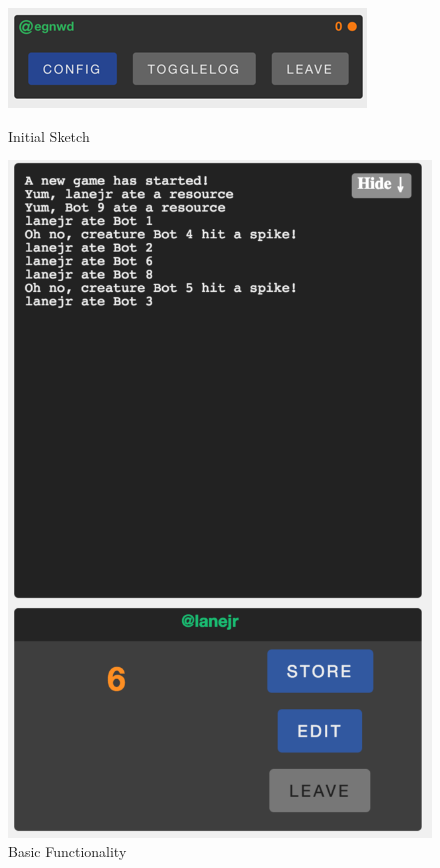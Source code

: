 \documentclass[a4paper, 6pt]{article}
\begin{document}
\begin{figure}[ht!]
\includegraphics[width=\linewidth]{userPanel_01.png}
\caption{Initial Sketch}
\endminipage\hfill
{}
\includegraphics[width=\linewidth]{userPanel_02.png}
\caption{Basic Functionality}
\endminipage\hfill

\end{figure}
\end{document}
